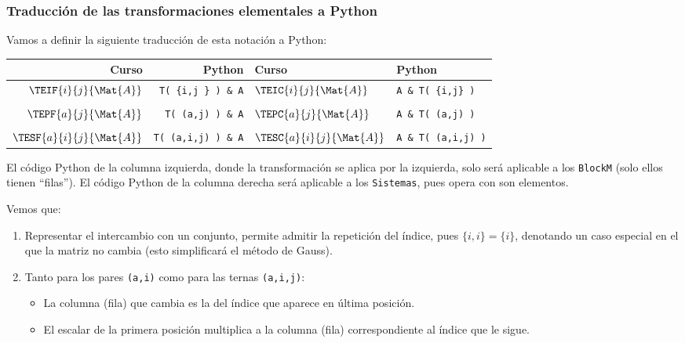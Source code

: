 \documentclass[11pt]{report}
\begin{document}
\subsubsection{Traducción de las transformaciones elementales a Python}
\label{sec:org33d6d45}

Vamos a definir la siguiente traducción de esta notación a Python:

\begin{center}
\begin{tabular}{rr|ll}
Curso & Python & Curso & Python\\
\hline
\(\TEIF{i}{j}{\Mat{A}}\) & \texttt{T( \{i,j \} ) \& A} & \(\TEIC{i}{j}{\Mat{A}}\) & \texttt{A \& T( \{i,j\} )}\\
 &  &  & \\
\(\TEPF{a}{j}{\Mat{A}}\) & \texttt{T( (a,j) ) \& A} & \(\TEPC{a}{j}{\Mat{A}}\) & \texttt{A \& T( (a,j) )}\\
 &  &  & \\
\(\TESF{a}{i}{j}{\Mat{A}}\) & \texttt{T( (a,i,j) ) \& A} & \(\TESC{a}{i}{j}{\Mat{A}}\) & \texttt{A \& T( (a,i,j) )}\\
\hline
\end{tabular}
\end{center}

El código Python de la columna izquierda, donde la transformación se
aplica por la izquierda, solo será aplicable a los \texttt{BlockM} (solo
ellos tienen ``filas''). El código Python de la columna derecha será
aplicable a los \texttt{Sistemas}, pues opera con son elementos.


Vemos que:
\begin{enumerate}
\item Representar el intercambio con un conjunto, permite admitir la
repetición del índice, pues \(\{i,i\}=\{i\}\), denotando un caso
especial en el que la matriz no cambia (esto simplificará el
método de Gauss).
\item Tanto para los pares \texttt{(a,i)} como para las ternas \texttt{(a,i,j)}:
\begin{itemize}
\item La columna (fila) que cambia es la del índice que aparece en última posición.
\item El escalar de la primera posición multiplica a la columna
(fila) correspondiente al índice que le sigue.
\end{itemize}
\end{enumerate}
\end{document}
